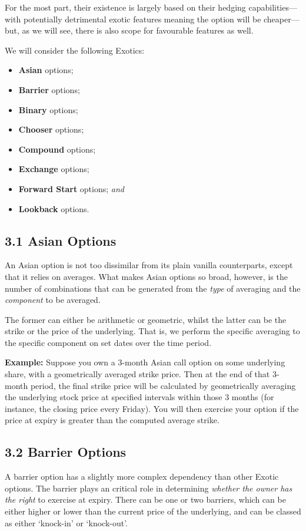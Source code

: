 \documentclass[11pt]{article}
\begin{document}
For the most part, their existence is largely based on their hedging capabilities––with potentially detrimental exotic features meaning the option will be cheaper––but, as we will see, there is also scope for favourable features as well. 

We will consider the following Exotics:

\begin{itemize}
    \item \textbf{Asian} options;
    \item \textbf{Barrier} options;
    \item \textbf{Binary} options;
    \item \textbf{Chooser} options;
    \item \textbf{Compound} options;
    \item \textbf{Exchange} options; 
    \item \textbf{Forward Start} options; \textit{and}
    \item \textbf{Lookback} options. 
\end{itemize}

\subsection*{3.1 Asian Options}
An Asian option is not too dissimilar from its plain vanilla counterparts, except that it relies on averages. What makes Asian options so broad, however, is the number of combinations that can be generated from the \textit{type} of averaging and the \textit{component} to be averaged.

The former can either be arithmetic or geometric, whilst the latter can be the strike or the price of the underlying. That is, we perform the specific averaging to the specific component on set dates over the time period. 

\textbf{Example:} Suppose you own a 3-month Asian call option on some underlying share, with a geometrically averaged strike price. Then at the end of that 3-month period, the final strike price will be calculated by geometrically averaging the underlying stock price at specified intervals within those 3 months (for instance, the closing price every Friday). You will then exercise your option if the price at expiry is greater than the computed average strike. 

\subsection*{3.2 Barrier Options}
A barrier option has a slightly more complex dependency than other Exotic options. The barrier plays an critical role in determining \textit{whether the owner has the right} to exercise at expiry. There can be one or two barriers, which can be either higher or lower than the current price of the underlying, and can be classed as either `knock-in' or `knock-out'. 
\end{document}
